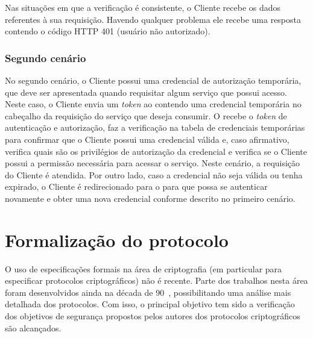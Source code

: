 Nas situa\c c\~{o}es em que a verifica\c c\~{a}o \'{e} consistente, 
o Cliente recebe os dados referentes à sua requisição. 
Havendo qualquer problema ele recebe uma resposta contendo o c\'{o}digo HTTP 401 (usuário não autorizado).


\subsubsection{Segundo cenário}

No segundo cenário, o Cliente possui uma credencial de autorização temporária, 
que deve ser apresentada quando requisitar algum serviço que possui acesso. 
Neste caso, o Cliente envia um \emph{token} ao \servidorRest{} contendo uma credencial temporária no cabeçalho da requisição do serviço que deseja 
consumir. O \servidorRest recebe o \emph{token} de autenticação e autorização, faz a verificação na tabela de credenciais temporárias 
para confirmar que o Cliente possui uma credencial válida e, caso afirmativo, verifica quais são os privilégios de 
autorização da credencial e verifica se o Cliente possui a permissão necess\'{a}ria para acessar o serviço. Neste cen\'{a}rio, 
a requisi\c c\~{a}o do Cliente é atendida. Por outro lado, 
caso a credencial não seja válida ou tenha expirado, o Cliente é redirecionado para o \servidorAA{} 
para que possa se autenticar novamente e obter uma nova credencial conforme descrito 
no primeiro cenário. %



\section{Formalização do protocolo}

O uso de especifica\c c\~{o}es formais na área de criptografia (em particular para especificar protocolos criptogr\'{a}ficos) 
não é recente. Parte dos trabalhos nesta área foram desenvolvidos ainda na década de 90~\cite{Meadows95}, 
possibilitando uma análise mais detalhada dos protocolos. Com isso, o principal objetivo 
tem sido a verifica\c c\~{a}o dos objetivos de seguran\c ca propostos 
pelos autores dos protocolos criptogr\'{a}ficos são alcançados.

